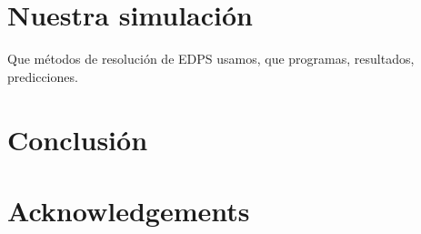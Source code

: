 \documentclass{article}
\begin{document}
\section{Nuestra simulación}
Que métodos de resolución de EDPS usamos, que programas, resultados, predicciones.

\section{Conclusión}


 
\section{Acknowledgements}


\

\end{document}
